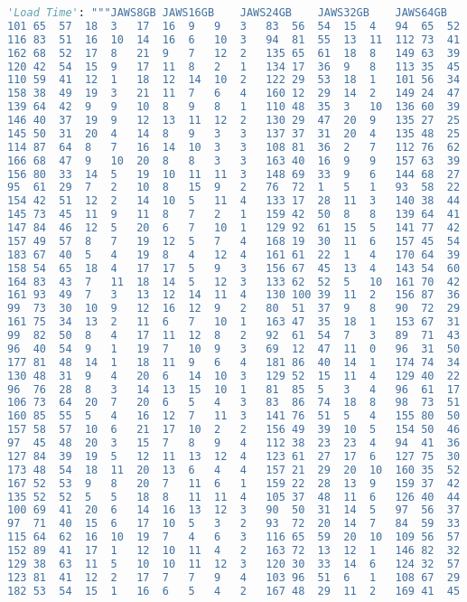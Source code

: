 \begin{lstlisting}[language=Python]
    'Load Time': """JAWS8GB	JAWS16GB	JAWS24GB	JAWS32GB	JAWS64GB	NVDA8GB	NVDA16GB	NVDA24GB	NVDA32GB	NVDA64GB	SUPERNOVA8GB	SUPERNOVA16GB	SUPERNOVA24GB	SUPERNOVA32GB	SUPERNOVA64GB	NARRATOR8GB	NARRATOR16GB	NARRATOR24GB	NARRATOR32GB	NARRATOR64GB
101	65	57	18	3	17	16	9	9	3	83	56	54	15	4	94	65	52	7	5
116	83	51	16	10	14	16	6	10	3	94	81	55	13	11	112	73	41	3	4
162	68	52	17	8	21	9	7	12	2	135	65	61	18	8	149	63	39	15	0
120	42	54	15	9	17	11	8	2	1	134	17	36	9	8	113	35	45	6	2
110	59	41	12	1	18	12	14	10	2	122	29	53	18	1	101	56	34	10	7
158	38	49	19	3	21	11	7	6	4	160	12	29	14	2	149	24	47	13	1
139	64	42	9	9	10	8	9	8	1	110	48	35	3	10	136	60	39	4	0
146	40	37	19	9	12	13	11	12	2	130	29	47	20	9	135	27	25	14	8
145	50	31	20	4	14	8	9	3	3	137	37	31	20	4	135	48	25	14	4
114	87	64	8	7	16	14	10	3	3	108	81	36	2	7	112	76	62	-7	3
166	68	47	9	10	20	8	8	3	3	163	40	16	9	9	157	63	39	0	6
156	80	33	14	5	19	10	11	11	3	148	69	33	9	6	144	68	27	12	10
95	61	29	7	2	10	8	15	9	2	76	72	1	5	1	93	58	22	-6	9
154	42	51	12	2	14	10	5	11	4	133	17	28	11	3	140	38	44	6	8
145	73	45	11	9	11	8	7	2	1	159	42	50	8	8	139	64	41	9	7
147	84	46	12	5	20	6	7	10	1	129	92	61	15	5	141	77	42	9	9
157	49	57	8	7	19	12	5	7	4	168	19	30	11	6	157	45	54	-4	6
183	67	40	5	4	19	8	4	12	4	161	61	22	1	4	170	64	39	-7	10
158	54	65	18	4	17	17	5	9	3	156	67	45	13	4	143	54	60	9	11
164	83	43	7	11	18	14	5	12	3	133	62	52	5	10	161	70	42	3	4
161	93	49	7	3	13	12	14	11	4	130	100	39	11	2	156	87	36	6	2
99	73	30	10	9	12	16	12	9	2	80	51	37	9	8	90	72	29	1	7
161	75	34	13	2	11	6	7	10	1	163	47	35	18	1	153	67	31	6	2
99	82	50	8	4	17	11	12	8	2	92	61	54	7	3	89	71	43	5	2
96	40	54	9	1	19	7	10	9	3	69	12	47	11	0	96	31	50	1	7
177	81	48	14	1	18	11	9	6	4	181	86	40	14	1	174	74	34	0	13
130	48	31	9	4	20	6	14	10	3	129	52	15	11	4	129	40	22	7	1
96	76	28	8	3	14	13	15	10	1	81	85	5	3	4	96	61	17	2	0
106	73	64	20	7	20	6	5	4	3	83	86	74	18	8	98	73	51	18	4
160	85	55	5	4	16	12	7	11	3	141	76	51	5	4	155	80	50	-5	3
157	58	57	10	6	21	17	10	2	2	156	49	39	10	5	154	50	46	4	1
97	45	48	20	3	15	7	8	9	4	112	38	23	23	4	94	41	36	14	4
127	84	39	19	5	12	11	13	12	4	123	61	27	17	6	127	75	30	19	3
173	48	54	18	11	20	13	6	4	4	157	21	29	20	10	160	35	52	17	7
167	52	53	9	8	20	7	11	6	1	159	22	28	13	9	159	37	42	-2	3
135	52	52	5	5	18	8	11	11	4	105	37	48	11	6	126	40	44	-2	5
100	69	41	20	6	14	16	13	12	3	90	50	31	14	5	97	56	37	16	0
97	71	40	15	6	17	10	5	3	2	93	72	20	14	7	84	59	33	8	5
115	64	62	16	10	19	7	4	6	3	116	65	59	20	10	109	56	57	11	7
152	89	41	17	1	12	10	11	4	2	163	72	13	12	1	146	82	32	5	5
129	38	63	11	5	10	10	11	12	3	120	30	33	14	6	124	32	57	9	7
123	81	41	12	2	17	7	7	9	4	103	96	51	6	1	108	67	29	6	7
182	53	54	15	1	16	6	5	4	2	167	48	29	11	2	169	41	45	3	4

\end{lstlisting}
